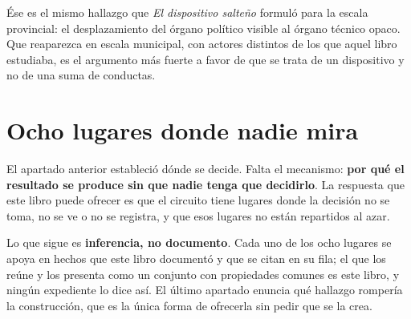 Ése es el mismo hallazgo que \textit{El dispositivo salteño} formuló para la escala provincial: el desplazamiento del órgano político visible al órgano técnico opaco. Que reaparezca en escala municipal, con actores distintos de los que aquel libro estudiaba, es el argumento más fuerte a favor de que se trata de un dispositivo y no de una suma de conductas.

\section{Ocho lugares donde nadie mira}

El apartado anterior estableció dónde se decide. Falta el mecanismo: \textbf{por qué el
resultado se produce sin que nadie tenga que decidirlo}. La respuesta que este libro puede
ofrecer es que el circuito tiene lugares donde la decisión no se toma, no se ve o no se
registra, y que esos lugares no están repartidos al azar.

\begin{cautela}
Lo que sigue es \textbf{inferencia, no documento}. Cada uno de los ocho lugares se apoya en
hechos que este libro documentó y que se citan en su fila; el que los reúne y los presenta como
un conjunto con propiedades comunes es este libro, y ningún expediente lo dice así. El último
apartado enuncia qué hallazgo rompería la construcción, que es la única forma de ofrecerla sin
pedir que se la crea.
\end{cautela}

